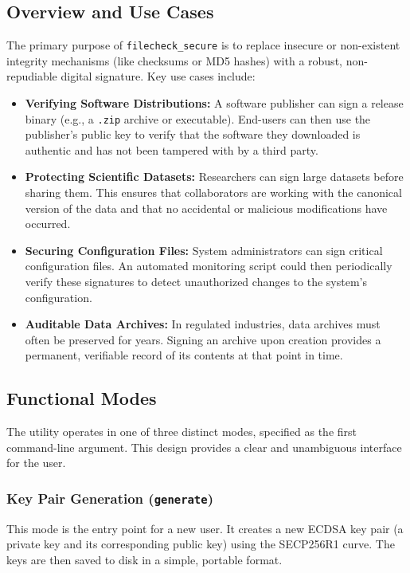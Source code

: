 \documentclass[12pt, letterpaper]{article}
\begin{document}
\subsection{Overview and Use Cases}
The primary purpose of \texttt{filecheck\_secure} is to replace insecure or non-existent integrity mechanisms (like checksums or MD5 hashes) with a robust, non-repudiable digital signature. Key use cases include:
\begin{itemize}
	\item \textbf{Verifying Software Distributions:} A software publisher can sign a release binary (e.g., a \texttt{.zip} archive or executable). End-users can then use the publisher's public key to verify that the software they downloaded is authentic and has not been tampered with by a third party.
	\item \textbf{Protecting Scientific Datasets:} Researchers can sign large datasets before sharing them. This ensures that collaborators are working with the canonical version of the data and that no accidental or malicious modifications have occurred.
	\item \textbf{Securing Configuration Files:} System administrators can sign critical configuration files. An automated monitoring script could then periodically verify these signatures to detect unauthorized changes to the system's configuration.
	\item \textbf{Auditable Data Archives:} In regulated industries, data archives must often be preserved for years. Signing an archive upon creation provides a permanent, verifiable record of its contents at that point in time.
\end{itemize}

\subsection{Functional Modes}
The utility operates in one of three distinct modes, specified as the first command-line argument. This design provides a clear and unambiguous interface for the user.

\subsubsection{Key Pair Generation (\texttt{generate})}
This mode is the entry point for a new user. It creates a new ECDSA key pair (a private key and its corresponding public key) using the SECP256R1 curve. The keys are then saved to disk in a simple, portable format.
\end{document}
